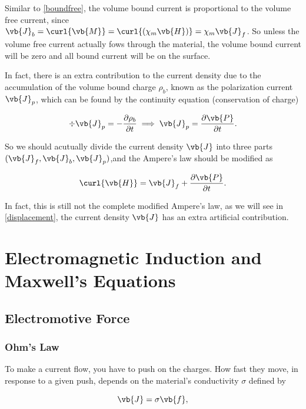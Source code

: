 \documentclass[english,a4paper,12pt]{report}
\begin{document}
Similar to \cref{boundfree}, the volume bound current is proportional to the volume free current, since \(\vb{J} _{b} = \curl{\vb{M} } = \curl{(\chi _{m}\vb{H}  )} = \chi _{m}\vb{J} _{f} \). So unless the volume free current actually fows through the material, the volume bound current will be zero and all bound current will be on the surface.  

In fact, there is an extra contribution to the current density due to the accumulation of the volume bound charge \(\rho _{b} \), known as the polarization current \(\vb{J} _{p} \), which can be found by the continuity equation (conservation of charge) 

\begin{equation}
    \div{\vb{J} _{p} } = - \frac{\partial \rho _{b} }{\partial t} \implies  \vb{J} _{p} = \frac{\partial \vb{P} }{\partial t}.
\end{equation}

So we should acutually divide the current density \(\vb{J} \) into three parts \((\vb{J} _{f}, \vb{J} _{b}, \vb{J} _{p})\),and the Ampere's law should be modified as 

\begin{equation}
    \curl{\vb{H} } = \vb{J} _{f} + \frac{\partial \vb{P} }{\partial t}. \label{comampere} 
\end{equation}

In fact, this is still not the complete modified Ampere's law, as we will see in \cref{displacement}, the current density \(\vb{J} \) has an extra artificial contribution.  


\chapter{Electromagnetic Induction and Maxwell's Equations}

\section{Electromotive Force}

\subsection{Ohm's Law}

To make a current flow, you have to push on the charges. How fast they move, in response to a given push, depends on the material's conductivity \(\sigma \) defined by 

\begin{equation}
    \vb{J} = \sigma \vb{f} , \label{ohm} 
\end{equation}
\end{document}

